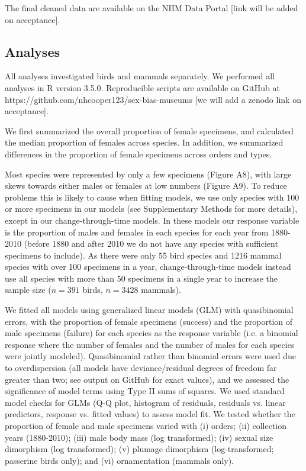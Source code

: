 \documentclass[a4paper, 12pt]{article}
\begin{document}
The final cleaned data are available on the NHM Data Portal [link will be added on acceptance]. 

\subsection{Analyses}
All analyses investigated birds and mammals separately. 
We performed all analyses in R version 3.5.0\cite{R}. 
Reproducible scripts are available on GitHub at https://github.com/nhcooper123/sex-bias-museums [we will add a zenodo link on acceptance].

We first summarized the overall proportion of female specimens, and calculated the median proportion of females across species. 
In addition, we summarized differences in the proportion of female specimens across orders and types. 

Most species were represented by only a few specimens (Figure A8), with large skews towards either males or females at low numbers (Figure A9). 
To reduce problems this is likely to cause when fitting models, we use only species with 100 or more specimens in our models (see Supplementary Methods for more details), except in our change-through-time models. 
In these models our response variable is the proportion of males and females in each species for each year from 1880-2010 (before 1880 and after 2010 we do not have any species with sufficient specimens to include). 
As there were only 55 bird species and 1216 mammal species with over 100 specimens in a year, change-through-time models instead use all species with more than 50 specimens in a single year to increase the sample size ($n = 391$ birds, $n = 3428$ mammals).

We fitted all models using generalized linear models (GLM) with quasibinomial errors, with the proportion of female specimens (success) and the proportion of male specimens (failure) for each species as the response variable (i.e. a binomial response where the number of females and the number of males for each species were jointly modeled). 
Quasibinomial rather than binomial errors were used due to overdispersion (all models have deviance/residual degrees of freedom far greater than two; see output on GitHub for exact values), and we assessed the significance of model terms using Type II sums of squares. 
We used standard model checks for GLMs (Q-Q plot, histogram of residuals, residuals vs. linear predictors, response vs. fitted values) to assess model fit. 
We tested whether the proportion of female and male specimens varied with (i) orders; (ii) collection years (1880-2010); (iii) male body mass (log transformed); (iv) sexual size dimorphism (log transformed); (v) plumage dimorphism (log-transformed; passerine birds only); and (vi) ornamentation (mammals only). 
\end{document}
